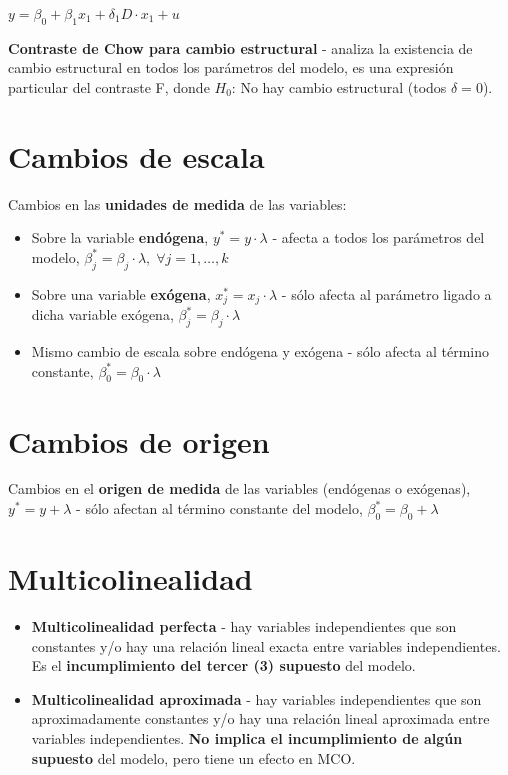 \documentclass[10pt, a4paper, landscape]{article}
\begin{document}
\begin{multicols}{3}
\begin{itemize}[leftmargin=*]
			\begin{center}
				$y = \beta_{0} + \beta_{1} x_{1} + \delta_{1} D \cdot x_{1} + u$
			\end{center}
		\end{itemize}
		
		\textbf{Contraste de Chow para cambio estructural} - analiza la existencia de cambio estructural en todos los parámetros del modelo, es una expresión particular del contraste F, donde $H_{0}$: No hay cambio estructural (todos $\delta = 0$).
		
		\section*{Cambios de escala}
		
		Cambios en las \textbf{unidades de medida} de las variables:
		
		\begin{itemize}[leftmargin=*]
			\item Sobre la variable \textbf{endógena}, $y^{*} = y \cdot \lambda$ - afecta a todos los parámetros del modelo, $\beta_{j}^{*} = \beta_{j} \cdot \lambda, \; \forall j = 1, \ldots, k$
			\item Sobre una variable \textbf{exógena}, $x_{j}^{*} = x_{j} \cdot \lambda$ - sólo afecta al parámetro ligado a dicha variable exógena, $\beta_{j}^{*} = \beta_{j} \cdot \lambda$
			\item Mismo cambio de escala sobre endógena y exógena - sólo afecta al término constante, $\beta_{0}^{*} = \beta_{0} \cdot \lambda$
		\end{itemize}
		
		\section*{Cambios de origen}
		
		Cambios en el \textbf{origen de medida} de las variables (endógenas o exógenas), $y^{*} = y + \lambda$ - sólo afectan al término constante del modelo, $\beta_{0}^{*} = \beta_{0} + \lambda$
		
		\columnbreak
		
		\section*{Multicolinealidad}
		
		\begin{itemize}[leftmargin=*]
			\item \textbf{Multicolinealidad perfecta} - hay variables independientes que son constantes y/o hay una relación lineal exacta entre variables independientes. Es el \textbf{incumplimiento del tercer (3) supuesto} del modelo.
			\item \textbf{Multicolinealidad aproximada} - hay variables independientes que son aproximadamente constantes y/o hay una relación lineal aproximada entre variables independientes. \textbf{No implica el incumplimiento de algún supuesto} del modelo, pero tiene un efecto en MCO.
		\end{itemize}
		

\end{multicols}
\end{document}
